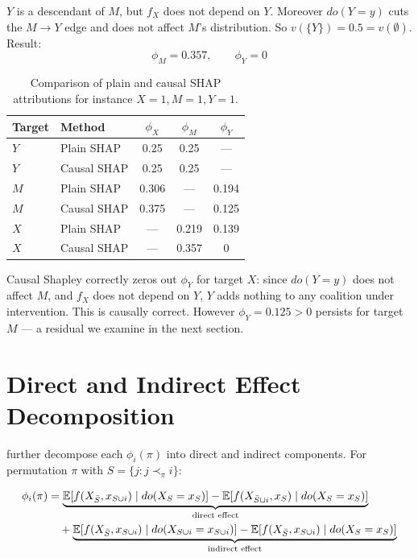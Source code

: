 \documentclass[12pt]{article}
\begin{document}
$Y$ is a descendant of $M$, but $f_X$ does not depend on $Y$. Moreover $do(Y=y)$ cuts the
$M \to Y$ edge and does not affect $M$'s distribution. So $v(\{Y\}) = 0.5 = v(\emptyset)$.
Result:
\begin{equation}
\phi_M = 0.357, \qquad \phi_Y = 0
\end{equation}

\begin{table}[h]
\centering
\begin{tabular}{llccc}
\toprule
Target & Method & $\phi_X$ & $\phi_M$ & $\phi_Y$ \\
\midrule
$Y$ & Plain SHAP       & 0.25  & 0.25  & ---   \\
$Y$ & Causal SHAP      & 0.25  & 0.25  & ---   \\
$M$ & Plain SHAP       & 0.306 & ---   & 0.194 \\
$M$ & Causal SHAP      & 0.375 & ---   & 0.125 \\
$X$ & Plain SHAP       & ---   & 0.219 & 0.139 \\
$X$ & Causal SHAP      & ---   & 0.357 & 0     \\
\bottomrule
\end{tabular}
\caption{Comparison of plain and causal SHAP attributions for instance $X=1, M=1, Y=1$.}
\end{table}

Causal Shapley correctly zeros out $\phi_Y$ for target $X$: since $do(Y=y)$ does not affect
$M$, and $f_X$ does not depend on $Y$, $Y$ adds nothing to any coalition under intervention.
This is causally correct. However $\phi_Y = 0.125 > 0$ persists for target $M$ --- a residual
we examine in the next section.

\section{Direct and Indirect Effect Decomposition}

\citet{heskes2020causal} further decompose each $\phi_i(\pi)$ into direct and indirect
components. For permutation $\pi$ with $S = \{j : j \prec_\pi i\}$:

\begin{align}
\phi_i(\pi) &= \underbrace{\mathbb{E}[f(X_{\bar{S}}, x_{S\cup i}) \mid do(X_S=x_S)]
              - \mathbb{E}[f(X_{\bar{S}\cup i}, x_S) \mid do(X_S=x_S)]}_{\text{direct effect}}
\notag\\
&\quad + \underbrace{\mathbb{E}[f(X_{\bar{S}}, x_{S\cup i}) \mid do(X_{S\cup i}=x_{S\cup i})]
              - \mathbb{E}[f(X_{\bar{S}}, x_{S\cup i}) \mid do(X_S=x_S)]}_{\text{indirect effect}}
\label{eq:decomp}
\end{align}
\end{document}
